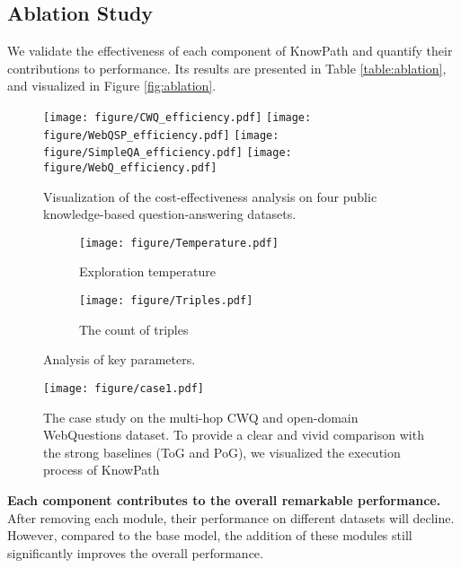 \subsection{Ablation Study}
We validate the effectiveness of each component of KnowPath and quantify their contributions to performance.
Its results are presented in Table \ref{table:ablation}, and visualized in Figure \ref{fig:ablation}.
\begin{figure*}[h]
  \centering
  \texttt{[image: figure/CWQ\_efficiency.pdf]}
  \texttt{[image: figure/WebQSP\_efficiency.pdf]}
  \hspace{0.01\linewidth}
  \texttt{[image: figure/SimpleQA\_efficiency.pdf]}
  \texttt{[image: figure/WebQ\_efficiency.pdf]}
  \caption{Visualization of the cost-effectiveness analysis on four public knowledge-based question-answering datasets.}
  \label{fig:efficiency-analysis}
\end{figure*}
\begin{figure}[t]
  \centering
  \begin{subfigure}{0.49\linewidth}
    \texttt{[image: figure/Temperature.pdf]}
    \caption{Exploration temperature}
      \label{fig:tempreture}
  \end{subfigure}
  \begin{subfigure}{0.49\linewidth}
    \texttt{[image: figure/Triples.pdf]}
    \caption{The count of triples}

    \label{fig:triple}
  \end{subfigure}
  \caption{Analysis of key parameters.}
  \label{fig:Parameter}
\end{figure}

\begin{figure*}[t]
  \centering
    \texttt{[image: figure/case1.pdf]}
  \caption{The case study on the multi-hop CWQ and open-domain WebQuestions dataset. To provide a clear and vivid comparison with the strong baselines (ToG and PoG), we visualized the execution process of KnowPath}
  \label{fig:case}
\end{figure*}


\textbf{Each component contributes to the overall remarkable performance.}
After removing each module, their performance on different datasets will decline. However, compared to the base model, the addition of these modules still significantly improves the overall performance.


